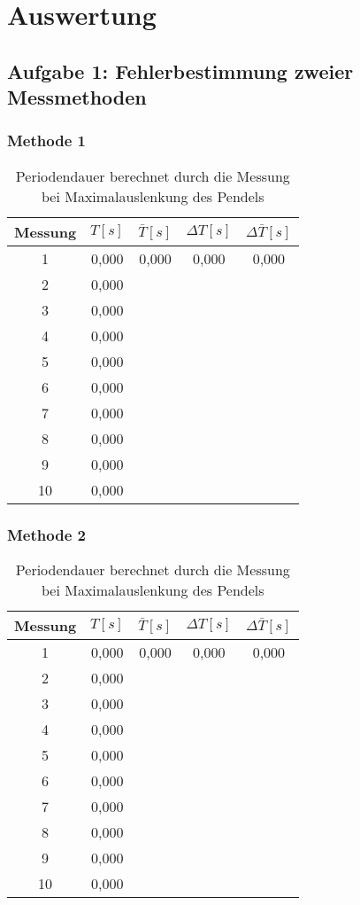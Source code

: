 \chapter{Auswertung}

\section{Aufgabe 1: Fehlerbestimmung zweier Messmethoden}
\subsection{Methode 1}
\begin{table}[h!]
    \centering
    \begin{tabular}{ccccc}\toprule
         Messung&  $T[s]$&  $\bar T[s]$& $\Delta T [s]$  & $\Delta \bar T [s]$\\\midrule
         1& 0,000 & 0,000 & 0,000 & 0,000\\
         2& 0,000 &  &  & \\
         3& 0,000 &  &  & \\
         4& 0,000 &  &  & \\
         5& 0,000 &  &  & \\
         6& 0,000 &  &  & \\
         7& 0,000 &  &  & \\
         8& 0,000 &  &  & \\
         9& 0,000 &  &  & \\
        10& 0,000 & & &\\ \bottomrule 
    \end{tabular}
    \caption{Periodendauer berechnet durch die Messung bei Maximalauslenkung des Pendels}
    \label{tab:periodendauer_Max}
\end{table}

\subsection{Methode 2}
\begin{table}[h!]
    \centering
    \begin{tabular}{ccccc}\toprule
         Messung&  $T[s]$&  $\bar T[s]$& $\Delta T [s]$  & $\Delta \bar T [s]$\\\midrule
         1& 0,000 & 0,000 & 0,000 & 0,000\\
         2& 0,000 &  &  & \\
         3& 0,000 &  &  & \\
         4& 0,000 &  &  & \\
         5& 0,000 &  &  & \\
         6& 0,000 &  &  & \\
         7& 0,000 &  &  & \\
         8& 0,000 &  &  & \\
         9& 0,000 &  &  & \\
        10& 0,000 & & &\\ \bottomrule 
    \end{tabular}
    \caption{Periodendauer berechnet durch die Messung bei Maximalauslenkung des Pendels}
    \label{tab:periodendauer_Max}
\end{table}

